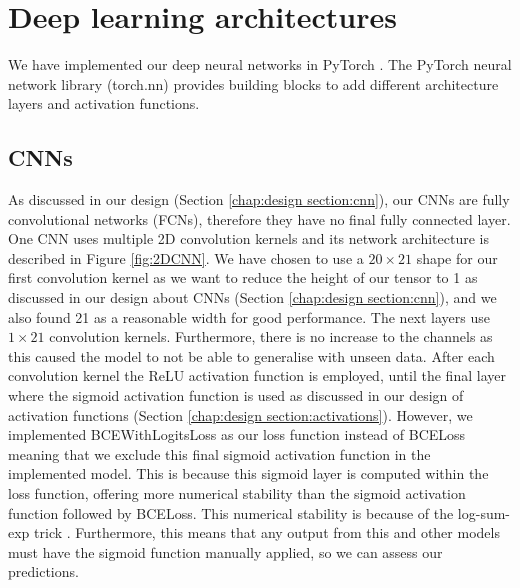\documentclass{l4proj}
\begin{document}
\section{Deep learning architectures}
\label{chap:implementation sec:architectures}

We have implemented our deep neural networks in PyTorch \citep{pytorch}. The PyTorch neural network library (torch.nn) provides building blocks to add different architecture layers and activation functions.

\subsection{CNNs}

As discussed in our design (Section \ref{chap:design section:cnn}), our CNNs are fully convolutional networks (FCNs), therefore they have no final fully connected layer. One CNN uses multiple 2D convolution kernels and its network architecture is described in Figure \ref{fig:2DCNN}. We have chosen to use a $20\times 21$ shape for our first convolution kernel as we want to reduce the height of our tensor to 1 as discussed in our design about CNNs (Section \ref{chap:design section:cnn}), and we also found 21 as a reasonable width for good performance. The next layers use $1\times 21$ convolution kernels. Furthermore, there is no increase to the channels as this caused the model to not be able to generalise with unseen data. After each convolution kernel the ReLU activation function is employed, until the final layer where the sigmoid activation function is used as discussed in our design of activation functions (Section \ref{chap:design section:activations}). However, we implemented BCEWithLogitsLoss as our loss function instead of BCELoss meaning that we exclude this final sigmoid activation function in the implemented model. This is because this sigmoid layer is computed within the loss function, offering more numerical stability than the sigmoid activation function followed by BCELoss. This numerical stability is because of the log-sum-exp trick \citep{Gundersen:20}. Furthermore, this means that any output from this and other models must have the sigmoid function manually applied, so we can assess our predictions.
\end{document}

